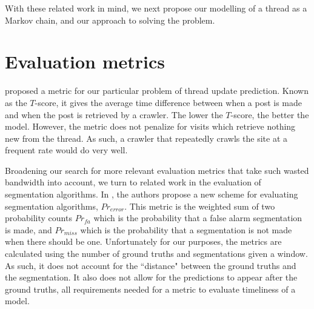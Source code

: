 


With these related work in mind, we next propose our modelling of a thread as a 
Markov chain, and our approach to solving the problem.

\section{Evaluation metrics}
 
 proposed a metric for our particular problem of thread update prediction. Known as the $T$-score, it gives the average 
time difference between when a post is made and when the post is retrieved by a crawler. The lower the $T$-score, the 
better the model. However, the metric does not penalize for visits which retrieve 
nothing new from the thread.  As such, a crawler that repeatedly crawls the site 
at a frequent rate would do very well.

Broadening our search for more relevant evaluation metrics that take such wasted bandwidth into account, we turn to related work in the evaluation of segmentation algorithms.  In , the authors propose a new scheme for evaluating 
segmentation algorithms, $Pr_{error}$. 
This metric is the weighted sum of two 
probability counts $Pr_{fa}$ which is the probability that a false alarm 
segmentation is made, and $Pr_{miss}$ which is the probability that a 
segmentation is not made when there should be one. Unfortunately for our 
purposes, the metrics are calculated using the number of ground truths and 
segmentations given a window. As such, it does not account for the ``distance" 
between the ground truths and the segmentation. It also does not allow for the 
predictions to appear after the ground truths, all requirements needed for a 
metric to evaluate timeliness of a model.

